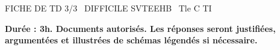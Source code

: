 \documentclass[11pt]{article}
\begin{document}
\begin{tcolorbox}[enhanced,colback=popink,colframe=popink,arc=10pt,boxrule=0pt,left=12pt,right=12pt,top=9pt,bottom=9pt]
{\color{white}\popxbold\small FICHE DE TD 3/3 \textbullet\ DIFFICILE \hfill SVTEEHB \textbullet\ Tle C TI\par}
\end{tcolorbox}
\vspace{4pt}
\textbf{Durée : 3h. Documents autorisés. Les réponses seront justifiées, argumentées et illustrées de schémas légendés si nécessaire.}
\end{document}
